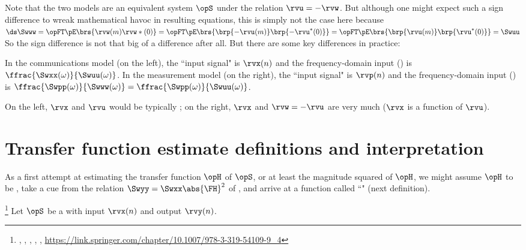 Note that the two models are an equivalent system $\opS$ under the relation $\rvu=-\rvw$.
But although one might expect such a sign difference to wreak mathematical havoc in resulting equations,
this is simply not the case here because
\\\indentx$\ds\Swww = \opFT\pE\brs{\rvw(m)\rvw\ast(0)}
                    = \opFT\pE\brs{\brp{-\rvu(m)}\brp{-\rvu^\ast(0)}}
                    = \opFT\pE\brs{\brp{\rvu(m)}\brp{\rvu^\ast(0)}}
                    = \Swuu$
\\
So the sign difference is not that big of a difference after all.
But there are some key differences in practice:
\begin{liste}
  \item In the communications model (on the left), the ``input signal" is $\rvx(n)$
      and the frequency-domain input  () is $\ffrac{\Swxx(\omega)}{\Swuu(\omega)}$.
      In the measurement model (on the right), the ``input signal" is $\rvp(n)$
      and the frequency-domain input  () is
         $\ffrac{\Swpp(\omega)}{\Swww(\omega)} = \ffrac{\Swpp(\omega)}{\Swuu(\omega)}$.

  \item On the left, $\rvx$ and $\rvu$ would be typically ;
        on the right, $\rvx$ and $\rvw=-\rvu$ are very much  ($\rvx$ is a function of $\rvu$).
\end{liste}

\section{Transfer function estimate definitions and interpretation}
As a first attempt at estimating the transfer function $\opH$ of $\opS$,
or at least the magnitude squared of $\opH$,
we might assume $\opH$ to be , take a cue from the relation
$\Swyy=\Swxx\abs{\FH}^2$ of ,
and arrive at a function called ``"
(next definition).
\begin{definition}
\footnote{
  ,
  ,
  ,
  ,
  ,
  \url{https://link.springer.com/chapter/10.1007/978-3-319-54109-9_4}
  }
\label{def:Txy}
Let $\opS$ be a  with input $\rvx(n)$ and output $\rvy(n)$.
\end{definition}

